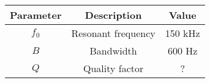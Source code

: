 \setlength{\arrayrulewidth}{0.3mm}
\setlength{\tabcolsep}{20pt}
\renewcommand{\arraystretch}{1.3}


\begin{tabular}{|c|c|c|}
\hline
Parameter & Description & Value\\
\hline
$f_0$ & Resonant frequency & 150 kHz\\
\hline
$B$ & Bandwidth & 600 Hz\\
\hline
$Q$ & Quality factor & ?\\
\hline
\end{tabular}